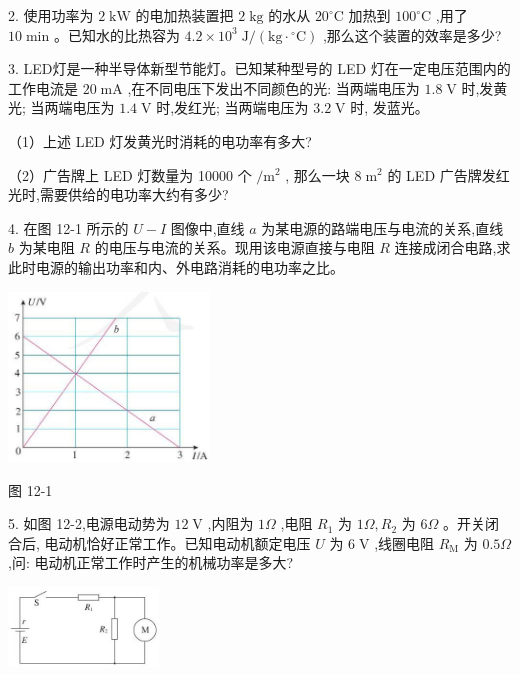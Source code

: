 \documentclass[10pt]{article}
\begin{document}
2. 使用功率为 \(2\mathrm{\;{kW}}\) 的电加热装置把 \(2\mathrm{\;{kg}}\) 的水从 \({20}^{ \circ }\mathrm{C}\) 加热到 \({100}^{ \circ }\mathrm{C}\) ,用了 \({10}\mathrm{\;{min}}\) 。已知水的比热容为 \({4.2} \times {10}^{3}\mathrm{\;J}/\left( {\mathrm{{kg}} \cdot {}^{ \circ }\mathrm{C}}\right)\) ,那么这个装置的效率是多少?

3. LED灯是一种半导体新型节能灯。已知某种型号的 LED 灯在一定电压范围内的工作电流是 \({20}\mathrm{\;{mA}}\) ,在不同电压下发出不同颜色的光: 当两端电压为 \({1.8}\mathrm{\;V}\) 时,发黄光; 当两端电压为 \({1.4}\mathrm{\;V}\) 时,发红光; 当两端电压为 \({3.2}\mathrm{\;V}\) 时, 发蓝光。

（1）上述 LED 灯发黄光时消耗的电功率有多大?

（2）广告牌上 LED 灯数量为 10000 个 \(/{\mathrm{m}}^{2}\) , 那么一块 \(8{\mathrm{\;m}}^{2}\) 的 LED 广告牌发红光时,需要供给的电功率大约有多少?

4. 在图 12-1 所示的 \(U - I\) 图像中,直线 \(a\) 为某电源的路端电压与电流的关系,直线 \(b\) 为某电阻 \(R\) 的电压与电流的关系。现用该电源直接与电阻 \(R\) 连接成闭合电路,求此时电源的输出功率和内、外电路消耗的电功率之比。

\begin{center}
\includegraphics[max width=0.4\textwidth]{images/01911d5f-8e38-70c0-b5b8-2b399bd115b6_105_568296.jpg}
\end{center}

图 12-1

5. 如图 12-2,电源电动势为 \({12}\mathrm{\;V}\) ,内阻为 \({1\Omega }\) ,电阻 \({R}_{1}\) 为 \({1\Omega },{R}_{2}\) 为 \({6\Omega }\) 。开关闭合后, 电动机恰好正常工作。已知电动机额定电压 \(U\) 为 \(6\mathrm{\;V}\) ,线圈电阻 \({R}_{\mathrm{M}}\) 为 \({0.5\Omega }\) ,问: 电动机正常工作时产生的机械功率是多大?

\begin{center}
\includegraphics[max width=0.3\textwidth]{images/01911d5f-8e38-70c0-b5b8-2b399bd115b6_105_951596.jpg}
\end{center}
\end{document}
